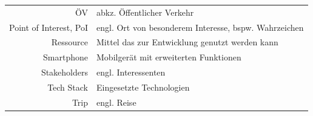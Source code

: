 \documentclass[ngerman,]{article}
\begin{document}
\begin{longtable}[]{@{}rl@{}}
\begin{minipage}[t]{0.18\columnwidth}\raggedleft\strut
ÖV\strut
\end{minipage} & \begin{minipage}[t]{0.76\columnwidth}\raggedright\strut
abkz. Öffentlicher Verkehr\strut
\end{minipage}\tabularnewline
\begin{minipage}[t]{0.18\columnwidth}\raggedleft\strut
Point of Interest, PoI\strut
\end{minipage} & \begin{minipage}[t]{0.76\columnwidth}\raggedright\strut
engl. Ort von besonderem Interesse, bspw. Wahrzeichen\strut
\end{minipage}\tabularnewline
\begin{minipage}[t]{0.18\columnwidth}\raggedleft\strut
Ressource\strut
\end{minipage} & \begin{minipage}[t]{0.76\columnwidth}\raggedright\strut
Mittel das zur Entwicklung genutzt werden kann\strut
\end{minipage}\tabularnewline
\begin{minipage}[t]{0.18\columnwidth}\raggedleft\strut
Smartphone\strut
\end{minipage} & \begin{minipage}[t]{0.76\columnwidth}\raggedright\strut
Mobilgerät mit erweiterten Funktionen\strut
\end{minipage}\tabularnewline
\begin{minipage}[t]{0.18\columnwidth}\raggedleft\strut
Stakeholders\strut
\end{minipage} & \begin{minipage}[t]{0.76\columnwidth}\raggedright\strut
engl. Interessenten\strut
\end{minipage}\tabularnewline
\begin{minipage}[t]{0.18\columnwidth}\raggedleft\strut
Tech Stack\strut
\end{minipage} & \begin{minipage}[t]{0.76\columnwidth}\raggedright\strut
Eingesetzte Technologien\strut
\end{minipage}\tabularnewline
\begin{minipage}[t]{0.18\columnwidth}\raggedleft\strut
Trip\strut
\end{minipage} & \begin{minipage}[t]{0.76\columnwidth}\raggedright\strut
engl. Reise\strut
\end{minipage}\tabularnewline

\end{longtable}
\end{document}
